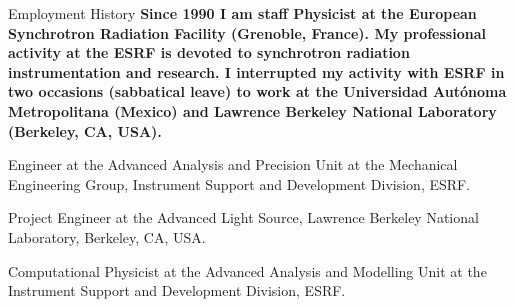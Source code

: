 \begin{rubric}{Employment History}
\entry*[]%
\textbf{Since 1990 I am staff Physicist at the European Synchrotron Radiation Facility (Grenoble, France). My professional activity at the ESRF is devoted to synchrotron radiation instrumentation and research. I interrupted my activity with ESRF in two occasions (sabbatical leave) to work at the Universidad Aut\'onoma Metropolitana (Mexico) and Lawrence Berkeley National Laboratory (Berkeley, CA, USA).}

% 
Engineer at the Advanced Analysis and Precision Unit at the Mechanical Engineering Group, Instrument Support and Development Division, ESRF.   

\entry*[2019/7/15 –- 2020/6/14]
Project Engineer at the Advanced Light Source, Lawrence Berkeley National Laboratory, Berkeley, CA, USA. 

\entry*[2009 –- 2019]  Computational Physicist at the Advanced Analysis and Modelling Unit at the Instrument Support and Development Division, ESRF. 



\end{rubric}
